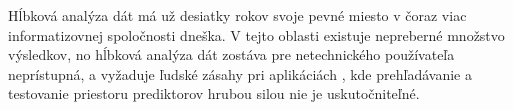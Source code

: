 Hĺbková analýza dát má už desiatky rokov svoje pevné miesto v čoraz viac informatizovnej spoločnosti dneška. V tejto oblasti existuje nepreberné množstvo výsledkov, no hĺbková analýza dát zostáva pre netechnického používateľa neprístupná, a vyžaduje ľudské zásahy pri aplikáciách \cite{handbook}, kde prehľadávanie a testovanie priestoru prediktorov hrubou silou nie je uskutočniteľné.


